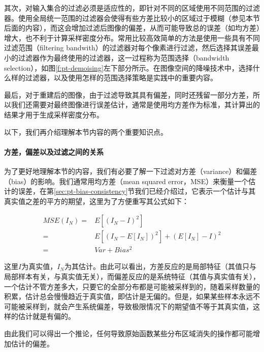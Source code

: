 其次，对输入集合的过滤必须是适应性的，即针对不同的区域使用不同范围的过滤器。使用全局统一范围的过滤器会使得有些方差比较小的区域过于模糊（参见本节后面的内容），而这会增加过滤后图像的偏差，从而可能导致总的误差（如均方差）增大，也不利于计算采样密度分布。常用比较高效简单的方法是使用一些具有不同过滤范围（filtering bandwith）的过滤器对每个像素进行过滤，然后选择其误差最小的过滤器作为最终使用的过滤器，这一过程称为范围选择（bandwidth selection），如图\ref{f:pt-demoising}左下部分所示。在图像空间的降噪技术中，选择什么样的过滤器，以及使用怎样的范围选择策略是实践中的重要内容。

最后，对于重建后的图像，由于过滤导致其具有偏差，同时还残留一部分方差，所以我们还需要对最终图像进行误差估计，通常是使用均方差作为标准，其计算出的结果才用于生成采样密度分布。

以下，我们再介绍理解本节内容的两个重要知识点。






\paragraph{方差，偏差以及过滤之间的关系}
为了更好地理解本节的内容，我们有必要了解一下过滤对方差（variance）和偏差（bias）的影响。我们通常用均方差（mean squared error，MSE）来衡量一个估计的误差，在第\ref{sec:pt-bias-consistency}节我们已经介绍过，它表示一个估计与其真实值之差的平方的期望，这里为了方便重写其公式如下：

\begin{equation}
\begin{aligned}
	MSE(I_N)=&E[(I_N-I)^2]\\
	        =&E[(I_N-E[I_N])^2]+(E[I_N]-I)^2\\
	        =&Var+Bias^{2}
\end{aligned}
\end{equation}

\noindent 这里$I$为真实值，$I_N$为其估计。由此可以看出，方差反应的是局部特征（其值只与局部样本有关，与真实值无关），而偏差反应的是系统特征（其值与真实值有关），一个估计不管方差多大，只要它的全部分布都是可能被采样到的，随着采样数量的积累，估计总会慢慢趋近于真实值，即估计是无偏的。但是，如果某些样本永远不可能被采样到，就会产生系统偏差，导致极限情况下的期望值不等于其真实值，这样的估计就是有偏的。

由此我们可以得出一个推论，任何导致原始函数某些分布区域消失的操作都可能增加估计的偏差。

